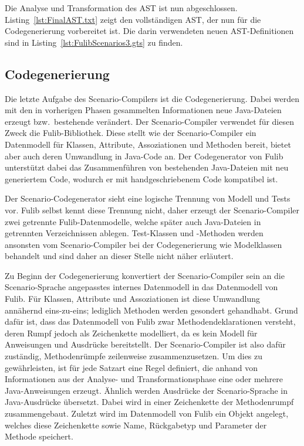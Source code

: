 Die Analyse und Transformation des AST ist nun abgeschlossen.
Listing~\ref{lst:FinalAST.txt} zeigt den vollständigen AST, der nun für die Codegenerierung vorbereitet ist.
Die darin verwendeten neuen AST-Definitionen sind in Listing~\ref{lst:FulibScenarios3.gts} zu finden.



\subsection{Codegenerierung}\label{subsec:codegen-fulib}

Die letzte Aufgabe des Scenario-Compilers ist die Codegenerierung.
Dabei werden mit den in vorherigen Phasen gesammelten Informationen neue Java-Dateien erzeugt bzw.\ bestehende verändert.
Der Scenario-Compiler verwendet für diesen Zweck die Fulib-Bibliothek\cite{fulib}.
Diese stellt wie der Scenario-Compiler ein Datenmodell für Klassen, Attribute, Assoziationen und Methoden bereit, bietet aber auch deren Umwandlung in Java-Code an.
Der Codegenerator von Fulib unterstützt dabei das Zusammenführen von bestehenden Java-Dateien mit neu generiertem Code, wodurch er mit handgeschriebenem Code kompatibel ist.

Der Scenario-Codegenerator sieht eine logische Trennung von Modell und Tests vor.
Fulib selbst kennt diese Trennung nicht, daher erzeugt der Scenario-Compiler zwei getrennte Fulib-Datenmodelle, welche später auch Java-Dateien in getrennten Verzeichnissen ablegen.
Test-Klassen und -Methoden werden ansonsten vom Scenario-Compiler bei der Codegenerierung wie Modelklassen behandelt und sind daher an dieser Stelle nicht näher erläutert.

Zu Beginn der Codegenerierung konvertiert der Scenario-Compiler sein an die Scenario-Sprache angepasstes internes Datenmodell in das Datenmodell von Fulib.
Für Klassen, Attribute und Assoziationen ist diese Umwandlung annähernd eins-zu-eins;
lediglich Methoden werden gesondert gehandhabt.
Grund dafür ist, dass das Datenmodell von Fulib zwar Methodendeklarationen versteht, deren Rumpf jedoch als Zeichenkette modelliert, da es kein Modell für Anweisungen und Ausdrücke bereitstellt.
Der Scenario-Compiler ist also dafür zuständig, Methodenrümpfe zeilenweise zusammenzusetzen.
Um dies zu gewährleisten, ist für jede Satzart eine Regel definiert, die anhand von Informationen aus der Analyse- und Transformationsphase eine oder mehrere Java-Anweisungen erzeugt.
Ähnlich werden Ausdrücke der Scenario-Sprache in Java-Ausdrücke übersetzt.
Dabei wird in einer Zeichenkette der Methodenrumpf zusammengebaut.
Zuletzt wird im Datenmodell von Fulib ein Objekt angelegt, welches diese Zeichenkette sowie Name, Rückgabetyp und Parameter der Methode speichert.

